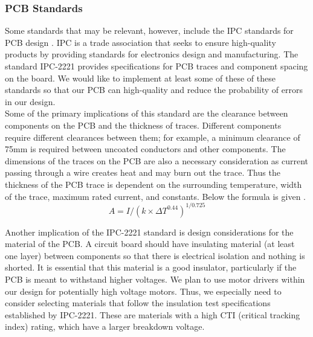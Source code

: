 \subsubsection{PCB Standards}
\noindent Some standards that may be relevant, however, include the IPC standards for PCB design \cite{ipc2221}. IPC is a trade association that seeks to ensure high-quality products by providing standards for electronics design and manufacturing. The standard IPC-2221 provides specifications for PCB traces and component spacing on the board. We would like to implement at least some of these of these standards so that our PCB can high-quality and reduce the probability of errors in our design. \\ 

\noindent Some of the primary implications of this standard are the clearance between components on the PCB and the thickness of traces. Different components require different clearances between them; for example, a minimum clearance of 75mm is required between uncoated conductors and other components. The dimensions of the traces on the PCB are also a necessary consideration as current passing through a wire creates heat and may burn out the trace. Thus the thickness of the PCB trace is dependent on the surrounding temperature, width of the trace, maximum rated current, and constants. Below the formula is given \cite{ipc2221}. \\

\noindent \[A = I / ({k \times \Delta T ^ {0.44}}) ^ {1/0.725}\]

\noindent Another implication of the IPC-2221 standard is design considerations for the material of the PCB. A circuit board should have insulating material (at least one layer) between components so that there is electrical isolation and nothing is shorted. It is essential that this material is a good insulator, particularly if the PCB is meant to withstand higher voltages. We plan to use motor drivers within our design for potentially high voltage motors. Thus, we especially need to consider selecting materials that follow the insulation test specifications established by IPC-2221. These are materials with a high CTI (critical tracking index) rating, which have a larger breakdown voltage.\\

